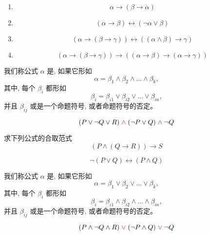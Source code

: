 \begin{frame}{}
  \begin{enumerate}[(1)]
    \item
      \[
        \alpha \to (\beta \to \alpha)
      \]
    \item
      \[
        (\alpha \to \beta) \leftrightarrow (\lnot \alpha \lor \beta)
      \]
    \item
      \[
        (\alpha \to (\beta \to \gamma)) \leftrightarrow ((\alpha \land \beta) \to \gamma)
      \]
    \item
      \[
        (\alpha \to (\beta \to \gamma)) \to ((\alpha \to \beta) \to (\alpha \to \gamma))
      \]
  \end{enumerate}
\end{frame}

\begin{frame}{}
  \begin{definition}
    我们称公式 $\alpha$ 是, 如果它形如
    \[
      \alpha = \beta_{1} \land \beta_{2} \land \dots \land \beta_{k},
    \]
    其中, 每个 $\beta_{i}$ 都形如
    \[
      \beta_{i} = \beta_{i1} \lor \beta_{i2} \lor \dots \lor \beta_{in},
    \]
    并且 $\beta_{ij}$ 或是一个命题符号, 或者命题符号的否定。
  \end{definition}

  \[
    (P \lor \lnot Q \lor R) \;\textcolor{red}{\land}\; (\lnot P \lor Q) \;\textcolor{red}{\land}\; \lnot Q
  \]
\end{frame}

\begin{frame}{}
  \begin{exampleblock}{求下列公式的合取范式}
    \[
      (P \land (Q \to R)) \to S
    \]

    \[
      \lnot (P \lor Q) \leftrightarrow (P \land Q)
    \]
  \end{exampleblock}
\end{frame}

\begin{frame}{}
  \begin{definition}
    我们称公式 $\alpha$ 是, 如果它形如
    \[
      \alpha = \beta_{1} \lor \beta_{2} \lor \dots \lor \beta_{k},
    \]
    其中, 每个 $\beta_{i}$ 都形如
    \[
      \beta_{i} = \beta_{i1} \land \beta_{i2} \land \dots \land \beta_{in},
    \]
    并且 $\beta_{ij}$ 或是一个命题符号, 或者命题符号的否定。
  \end{definition}

  \[
    (P \land \lnot Q \land R) \;\textcolor{red}{\lor}\; (\lnot P \land Q) \;\textcolor{red}{\lor}\; \lnot Q
  \]
\end{frame}


